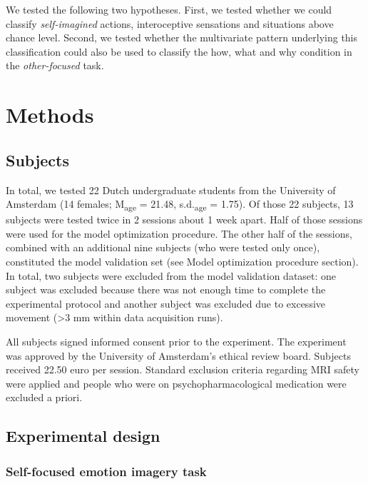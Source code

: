 \documentclass[12pt,american,a4paper,oneside,]{memoir} %
\begin{document}
We tested the following two hypotheses. First, we tested whether we could classify \emph{self-imagined} actions, interoceptive sensations and situations above chance level. Second, we tested whether the multivariate pattern underlying this classification could also be used to classify the how, what and why condition in the \emph{other-focused} task.

\hypertarget{shared-states-methods}{%
\section{Methods}\label{shared-states-methods}}

\hypertarget{shared-states-methods-subjects}{%
\subsection{Subjects}\label{shared-states-methods-subjects}}

In total, we tested 22 Dutch undergraduate students from the University of Amsterdam (14 females; M\textsubscript{age} = 21.48, s.d.\textsubscript{age} = 1.75). Of those 22 subjects, 13 subjects were tested twice in 2 sessions about 1 week apart. Half of those sessions were used for the model optimization procedure. The other half of the sessions, combined with an additional nine subjects (who were tested only once), constituted the model validation set (see Model optimization procedure section). In total, two subjects were excluded from the model validation dataset: one subject was excluded because there was not enough time to complete the experimental protocol and another subject was excluded due to excessive movement (\textgreater3 mm within data acquisition runs).

All subjects signed informed consent prior to the experiment. The experiment was approved by the University of Amsterdam's ethical review board. Subjects received 22.50 euro per session. Standard exclusion criteria regarding MRI safety were applied and people who were on psychopharmacological medication were excluded a priori.

\hypertarget{shared-states-methods-experimental-design}{%
\subsection{Experimental design}\label{shared-states-methods-experimental-design}}

\hypertarget{shared-states-methods-experimental-design-sf-task}{%
\subsubsection{Self-focused emotion imagery task}\label{shared-states-methods-experimental-design-sf-task}}
\end{document}
